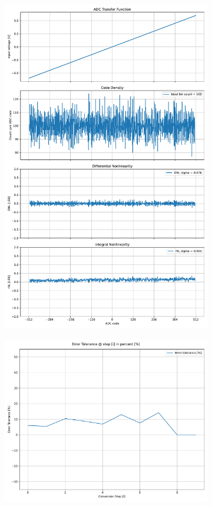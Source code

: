 \documentclass[varwidth]{standalone}
\begin{document}
\begin{figure}
\begin{subfigure}{0.32\textwidth}
    \includegraphics[width=\textwidth]{behavioral_10b_mismatch_binrecomb_nonlinearity.pdf}
\end{subfigure}
\begin{subfigure}{0.32\textwidth}
    \includegraphics[width=\textwidth]{behavioral_10b_mismatch_binrecomb_redundancy.pdf}

\end{subfigure}
\end{figure}
\end{document}
